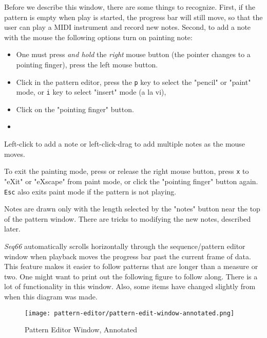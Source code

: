    Before we describe this window, there are some things to recognize.
   First, if the pattern is empty when play is started, the progress bar will
   still move, so that the user can play a MIDI instrument and record new notes.
   Second, to add a note with the mouse the following options turn on painting
   note:

   \begin{itemize}
      \item One must press \textsl{and hold} the \textsl{right}
         mouse button (the pointer changes to a pointing finger),
         press the left mouse button.
      \item Click in the pattern editor, press the
         \texttt{p} key to select the "pencil" or "paint" mode,
         or
         \texttt{i} key to select "insert" mode (a la vi),
      \item Click on the "pointing finger" button.
      \item 
   \end{itemize}

   Left-click to add a note or
   left-click-drag to add multiple notes as the mouse moves.

   To exit the painting mode,
   press or release the right mouse button, press
   \texttt{x} to "eXit" or "eXscape" from paint mode,
   or click the "pointing finger" button again.
   \texttt{Esc} also exits paint mode if the pattern is not playing.

   Notes are drawn only with the length selected by the "notes" button
   near the top of the pattern window.  There are tricks to
   modifying the new notes, described later.

   \textsl{Seq66} automatically scrolls
   horizontally through the sequence/pattern editor window when
   playback moves the progress bar past the current frame of data.
   This feature makes it easier to follow patterns that are longer than a
   measure or two.
   One might want to print out the following figure to follow along.  There is
   a lot of functionality in this window.
   Also, some items have changed slightly from when this diagram was made.

\begin{figure}[H]
   \centering 
   \texttt{[image: pattern-editor/pattern-edit-window-annotated.png]}
   \caption{Pattern Editor Window, Annotated}
   \label{fig:pattern_editor_window_annotated}
\end{figure}

